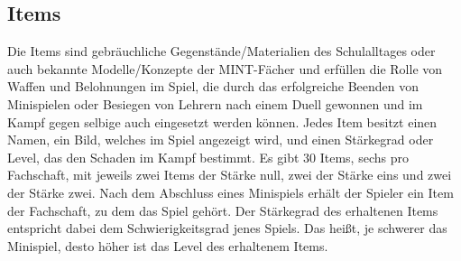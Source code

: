\subsection{Items}
Die Items sind gebräuchliche Gegenstände/Materialien des Schulalltages oder auch bekannte Modelle/Konzepte der MINT-Fächer und erfüllen die Rolle von Waffen und Belohnungen im Spiel, die durch das erfolgreiche Beenden von Minispielen oder Besiegen von Lehrern nach einem Duell gewonnen und im Kampf gegen selbige auch eingesetzt werden können. Jedes Item besitzt einen Namen, ein Bild, welches im Spiel angezeigt wird, und einen Stärkegrad oder \glqq{}Level\grqq{}, das den Schaden im Kampf bestimmt. Es gibt 30 Items, sechs pro Fachschaft, mit jeweils zwei Items der Stärke null, zwei der Stärke eins und zwei der Stärke zwei. Nach dem Abschluss eines Minispiels erhält der Spieler ein Item der Fachschaft, zu dem das Spiel gehört. Der Stärkegrad des erhaltenen Items entspricht dabei dem Schwierigkeitsgrad jenes Spiels. Das heißt, je schwerer das Minispiel, desto höher ist das Level des erhaltenem Items.
